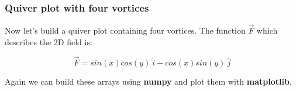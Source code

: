 \documentclass{book}
\begin{document}
    \begin{center}
    \end{center}
    { \hspace*{\fill} \\}
    

    
        \subsubsection{Quiver plot with four
vortices}\label{quiver-plot-with-four-vortices}

Now let's build a quiver plot containing four vortices. The function
\(\vec{F}\) which describes the 2D field is:

\[ \vec{F} = sin(x)cos(y) \ \hat{i} -cos(x)sin(y) \ \hat{j} \]

Again we can build these arrays using \textbf{numpy} and plot them with
\textbf{matplotlib}.
    
\end{document}
